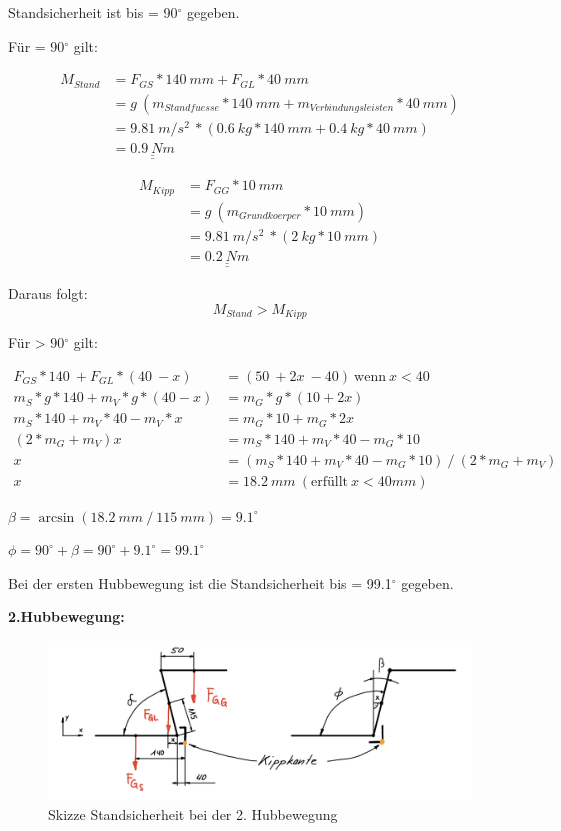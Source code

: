 Standsicherheit ist bis {\alpha} = 90$^\circ$ gegeben.

Für {\alpha} = 90$^\circ$ gilt:

\begin{align*}
    M_{Stand} &= F_{GS} * 140\ mm + F_{GL} * 40\ mm \\
    &= g\ (m_{Standfuesse} * 140\ mm + m_{Verbindungsleisten} * 40\ mm) \\
    &= 9.81\ m/s^2\ * (0.6\ kg * 140\ mm + 0.4\ kg * 40\ mm) \\
    &= \underline{\underline{0.9\ Nm}}
\end{align*}

\begin{align*}
    M_{Kipp} &= F_{GG} * 10\ mm \\
    &= g\ (m_{Grundkoerper} * 10\ mm) \\
    &= 9.81\ m/s^2\ * (2\ kg * 10\ mm) \\
    &= \underline{\underline{0.2\ Nm}}
\end{align*}

Daraus folgt:
\[M_{Stand} > M_{Kipp}\]

\newpage
Für {\alpha} > 90$^\circ$ gilt:

\begin{align*}
    F_{GS} * 140\ + F_{GL} * (40\ - x) &= (50\ + 2x\ - 40)\ \text{wenn}\ x < 40 \\
    m_{S} * g * 140 + m_{V} * g * (40 - x) &= m_{G} * g * (10 + 2x) \\
    m_{S} * 140 + m_{V} * 40 - m_{V} * x &= m_{G} * 10 + m_{G} * 2x \\
    (2 * m_{G} + m_{V}) x &= m_{S} * 140 + m_{V} * 40 - m_{G} * 10 \\
    x &= (m_{S} * 140 + m_{V} * 40 - m_{G} * 10)\ /\ (2 * m_{G} + m_{V}) \\
    x &= 18.2\ mm\ (\text{erfüllt}\ x < 40 mm)
\end{align*}


\({\beta} = \arcsin{(18.2\ mm\ /\ 115\ mm)} = 9.1^{\circ} \)

\({\phi} = 90^{\circ} + {\beta} = 90^{\circ} + 9.1^{\circ} = 99.1^{\circ} \)

Bei der ersten Hubbewegung ist die Standsicherheit bis {\phi} = 99.1$^\circ$ gegeben.


\textbf{2.Hubbewegung:}

\begin{figure}[H]
  \includegraphics[width=1\textwidth]{img/Treppensteigen/Standsicherheit 1.Hub.png}
  \centering
  \caption{Skizze Standsicherheit bei der 2. Hubbewegung}
\end{figure}

